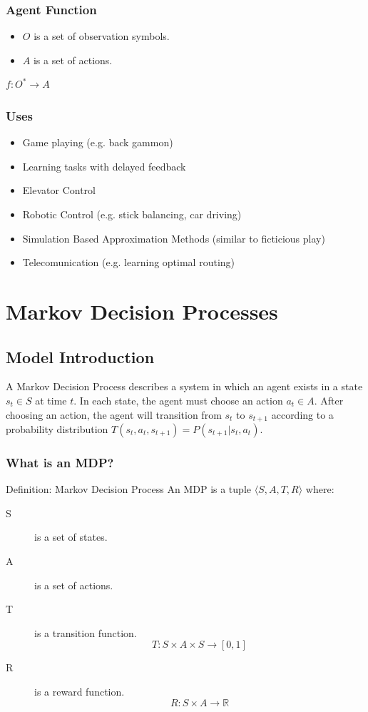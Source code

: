 \documentclass[ignorenonframetext]{beamer}
\begin{document}
\begin{frame}
	\frametitle{Agent Function}
	\begin{itemize}
		\item $O$ is a set of observation symbols.
		\item $A$ is a set of actions.
	\end{itemize}
	\begin{block}{}
		\begin{center}
			$f: O^* \rightarrow A $
		\end{center}
	\end{block}
\end{frame}

\begin{frame}
	\frametitle{Uses}
	\begin{itemize}
		\item Game playing (e.g. back gammon)
		\item Learning tasks with delayed feedback
		\item Elevator Control
		\item Robotic Control (e.g. stick balancing, car driving)
		\item Simulation Based Approximation Methods (similar to
			ficticious play)
		\item Telecomunication (e.g. learning optimal
			routing)
	\end{itemize}
\end{frame}

\section{Markov Decision Processes}

\subsection{Model Introduction}

A Markov Decision Process describes a system in which an agent exists
in a state $s_t \in S$ at time $t$.  In each state, the agent must choose
an action $a_t \in A$.  After choosing an action, the agent will
transition from $s_t$ to $s_{t+1}$ according to a probability
distribution $T(s_t, a_t, s_{t+1}) = P(s_{t+1} | s_t, a_t)$.

\begin{frame}
	\frametitle{What is an MDP?}
	\begin{block}{Definition: Markov Decision Process}
		An MDP is a tuple $\langle S, A, T, R \rangle$ where:
		\begin{description}
			\item[S] is a set of states.
			\item[A] is a set of actions.
			\item[T] is a transition function. 
				\[ T: S\times A\times S \rightarrow [0,1] \]
			\item[R] is a reward function. 
				\[ R: S\times A \rightarrow \mathbb{R} \] 
		\end{description}
	\end{block}
\end{frame}
\end{document}
